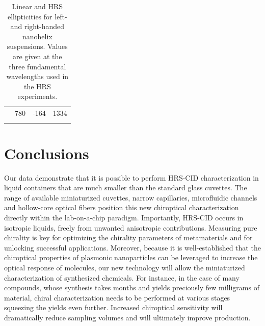 \begin{table}[tbp]
\begin{tabular}{llll}
                                                                & 780                                                                    & -164                                                                  & 1334                                                               \\ 
    \lasthline
    \end{tabular}
    \caption{Linear and HRS ellipticities for left- and right-handed nanohelix suspensions. Values are given at the three fundamental wavelengths used in the HRS experiments.}
    \label{table:HRS:ellipticity}
\end{table}


\section{Conclusions}
Our data demonstrate that it is possible to perform HRS-CID characterization in liquid containers that are much smaller than the standard glass cuvettes. The range of available miniaturized cuvettes, narrow capillaries, microfluidic channels and hollow-core optical fibers position this new chiroptical characterization directly within the lab-on-a-chip paradigm. Importantly, HRS-CID occurs in isotropic liquids, freely from unwanted anisotropic contributions. Measuring pure chirality is key for optimizing the chirality parameters of metamaterials and for unlocking successful applications. Moreover, because it is well-established that the chiroptical properties of plasmonic nanoparticles can be leveraged to increase the optical response of molecules, our new technology will allow the miniaturized characterization of synthesized chemicals. For instance, in the case of many compounds, whose synthesis takes months and yields preciously few milligrams of material, chiral characterization needs to be performed at various stages squeezing the yields even further. Increased chiroptical sensitivity will dramatically reduce sampling volumes and will ultimately improve production. 